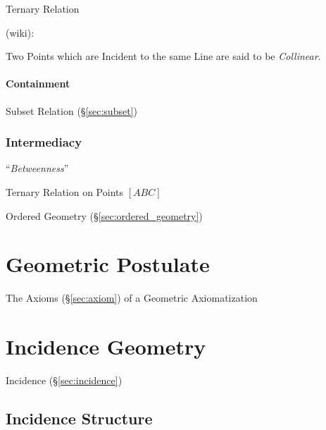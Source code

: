 Ternary Relation

(wiki):

Two Points which are Incident to the same Line are said to be \emph{Collinear}.



\paragraph{Containment}\label{sec:containment}\hfill

\fist Subset Relation (\S\ref{sec:subset})



\subsubsection{Intermediacy}\label{sec:intermediacy}

``\emph{Betweenness}''

Ternary Relation on Points $[ABC]$

Ordered Geometry (\S\ref{sec:ordered_geometry})



\section{Geometric Postulate}\label{sec:geometric_postulate}

The Axioms (\S\ref{sec:axiom}) of a Geometric Axiomatization



\section{Incidence Geometry}\label{sec:incidence_geometry}

Incidence (\S\ref{sec:incidence})



\subsection{Incidence Structure}\label{sec:incidence_structure}

